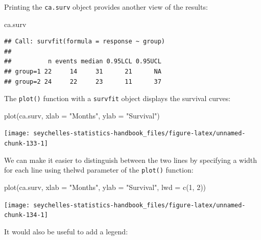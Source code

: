 \documentclass[
  12pt,
]{book}
\newenvironment{Shaded}{\begin{snugshade}}{\end{snugshade}}
\newcommand{\AttributeTok}[1]{\textcolor[rgb]{0.77,0.63,0.00}{#1}}
\newcommand{\DecValTok}[1]{\textcolor[rgb]{0.00,0.00,0.81}{#1}}
\newcommand{\FunctionTok}[1]{\textcolor[rgb]{0.00,0.00,0.00}{#1}}
\newcommand{\NormalTok}[1]{#1}
\newcommand{\SpecialCharTok}[1]{\textcolor[rgb]{0.00,0.00,0.00}{#1}}
\newcommand{\StringTok}[1]{\textcolor[rgb]{0.31,0.60,0.02}{#1}}
\begin{document}
Printing the \texttt{ca.surv} object provides another view of the results:

\begin{Shaded}
\begin{Highlighting}[]
\NormalTok{ca.surv}
\end{Highlighting}
\end{Shaded}

\begin{verbatim}
## Call: survfit(formula = response ~ group)
## 
##          n events median 0.95LCL 0.95UCL
## group=1 22     14     31      21      NA
## group=2 24     22     23      11      37
\end{verbatim}

The \texttt{plot()} function with a \texttt{survfit} object displays the survival curves:

\begin{Shaded}
\begin{Highlighting}[]
\FunctionTok{plot}\NormalTok{(ca.surv, }\AttributeTok{xlab =} \StringTok{"Months"}\NormalTok{, }\AttributeTok{ylab =} \StringTok{"Survival"}\NormalTok{)}
\end{Highlighting}
\end{Shaded}

\begin{center}\texttt{[image: seychelles-statistics-handbook\_files/figure-latex/unnamed-chunk-133-1]} \end{center}

We can make it easier to distinguish between the two lines by specifying a width for each line using thelwd
parameter of the \texttt{plot()} function:

\begin{Shaded}
\begin{Highlighting}[]
\FunctionTok{plot}\NormalTok{(ca.surv, }\AttributeTok{xlab =} \StringTok{"Months"}\NormalTok{, }\AttributeTok{ylab =} \StringTok{"Survival"}\NormalTok{, }\AttributeTok{lwd =} \FunctionTok{c}\NormalTok{(}\DecValTok{1}\NormalTok{, }\DecValTok{2}\NormalTok{))}
\end{Highlighting}
\end{Shaded}

\begin{center}\texttt{[image: seychelles-statistics-handbook\_files/figure-latex/unnamed-chunk-134-1]} \end{center}

It would also be useful to add a legend:

\begin{Shaded}
\end{Shaded}
\end{document}
